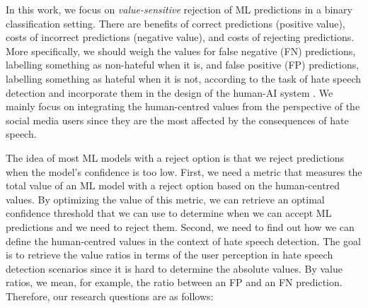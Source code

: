 %
In this work, we focus on \textit{value-sensitive} rejection of ML predictions in a binary classification setting.
%
There are benefits of correct predictions (positive value), costs of incorrect predictions (negative value), and costs of rejecting predictions.
%
More specifically, we should weigh the values for false negative (FN) predictions, labelling something as non-hateful when it is, and false positive (FP) predictions, labelling something as hateful when it is not, according to the task of hate speech detection and incorporate them in the design of the human-AI system \citep{sayin2021science}.
%
We mainly focus on integrating the human-centred values from the perspective of the social media users since they are the most affected by the consequences of hate speech.
%

%
The idea of most ML models with a reject option is that we reject predictions when the model's confidence is too low.
%
First, we need a metric that measures the total value of an ML model with a reject option based on the human-centred values.
%
By optimizing the value of this metric, we can retrieve an optimal confidence threshold that we can use to determine when we can accept ML predictions and we need to reject them.
%
Second, we need to find out how we can define the human-centred values in the context of hate speech detection.
%
The goal is to retrieve the value ratios in terms of the user perception in hate speech detection scenarios since it is hard to determine the absolute values.
%
By value ratios, we mean, for example, the ratio between an FP and an FN prediction.
%
Therefore, our research questions are as follows:
%

\noindent{}\newline

